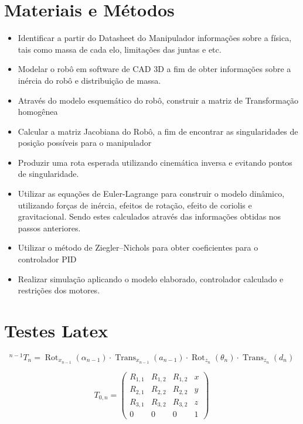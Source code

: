 


\section{Materiais e Métodos} %
 \begin{itemize}
    \item Identificar a partir do Datasheet do Manipulador informações sobre a física, tais como massa de cada elo, limitações das juntas e etc.
    \item Modelar o robô em software de CAD 3D a fim de obter informações sobre a inércia do robô e distribuição de massa.
    \item Através do modelo esquemático do robô, construir a matriz de Transformação homogênea
    \item Calcular a matriz Jacobiana do Robô, a fim de encontrar as singularidades de posição possíveis para o manipulador
    \item Produzir uma rota esperada utilizando cinemática inversa e evitando pontos de singularidade.
    \item Utilizar as equações de Euler-Lagrange para construir o modelo dinâmico, utilizando forças de inércia, efeitos de rotação, efeito de coriolis e gravitacional. Sendo estes calculados através das informações obtidas nos passos anteriores.
    \item Utilizar o método de Ziegler–Nichols para obter coeficientes para o controlador PID
    \item Realizar simulação aplicando o modelo elaborado, controlador calculado e restrições dos motores.
 \end{itemize}

\section{Testes Latex}  
\begin{equation}
{}^{n - 1}T_n  =
\operatorname{Rot}_{x_{n-1}}(\alpha_{n-1}) \cdot \operatorname{Trans}_{x_{n-1}}(a_{n-1}) \cdot \operatorname{Rot}_{z_{n}}(\theta_n) \cdot \operatorname{Trans}_{z_{n}}(d_n)
\end{equation}

\begin{equation}
T_{0,n} = 
\begin{pmatrix}
R_{1,1} & R_{1,2} & R_{1,2} & x \\
R_{2,1} & R_{2,2} & R_{2,2} & y \\
R_{3,1} & R_{3,2} & R_{3,2} & z \\
0 & 0 & 0 & 1
\end{pmatrix}
\end{equation}


